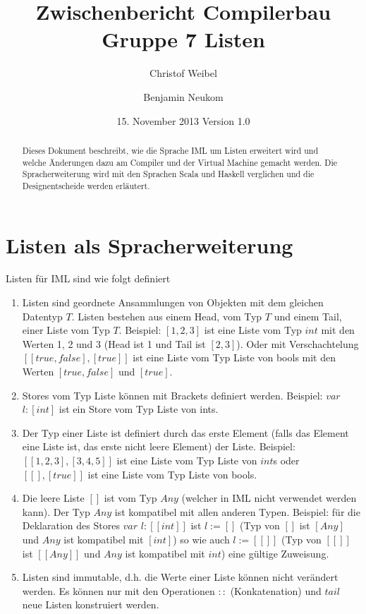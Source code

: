\documentclass[a4paper,notitlepage,oneside]{scrartcl}
\title{Zwischenbericht Compilerbau Gruppe 7 Listen}
\author{Christof Weibel \and Benjamin Neukom}
\date{15. November 2013 Version 1.0}
\begin{document}
\maketitle

\begin{abstract}
Dieses  Dokument beschreibt, wie die Sprache IML um Listen erweitert wird und welche Änderungen dazu am Compiler und der Virtual Machine gemacht werden. Die Spracherweiterung wird mit den Sprachen Scala und Haskell verglichen und die Designentscheide werden erläutert.
\end{abstract}


\section{Listen als Spracherweiterung}
Listen für IML sind wie folgt definiert

\begin{enumerate}

  \item Listen sind geordnete Ansammlungen von Objekten mit dem gleichen Datentyp $T$. Listen bestehen aus einem Head, vom Typ $T$ und einem Tail, einer Liste vom Typ $T$. Beispiel: $[1,2,3]$ ist eine Liste vom Typ $int$ mit den Werten 1, 2 und 3 (Head ist 1 und Tail ist $[2, 3]$). Oder mit Verschachtelung $[[true, false], [true]]$ ist eine Liste vom Typ Liste von bools mit den Werten $[true,false]$ und $[true]$.

  \item Stores vom Typ Liste können mit Brackets definiert werden. Beispiel: $var$ $l:[int]$ ist ein Store vom Typ Liste von ints.
    
  \item Der Typ einer Liste ist definiert durch das erste Element (falls das Element eine Liste ist, das erste nicht leere Element) der Liste. Beispiel:  $[[1,2,3],[3,4,5]]$ ist eine Liste vom Typ Liste von $int$s oder $[[], [true]]$ ist eine Liste vom Typ Liste von bools.

  \item Die leere Liste $[]$ ist vom Typ $Any$ (welcher in IML nicht verwendet werden kann). Der Typ $Any$ ist kompatibel mit allen anderen Typen. Beispiel: für die Deklaration des Stores $var$ $l:[[int]]$ ist $l := []$ (Typ von $[]$ ist $[Any]$ und $Any$ ist kompatibel mit $[int]$) so wie auch $l := [[]]$ (Typ von $[[]]$ ist $[[Any]]$ und $Any$ ist kompatibel mit $int$) eine gültige Zuweisung.

  \item Listen sind immutable, d.h. die Werte einer Liste können nicht verändert werden. Es können nur mit den Operationen $::$ (Konkatenation) und $tail$ neue Listen konstruiert werden.
\end{enumerate} 
\end{document}
